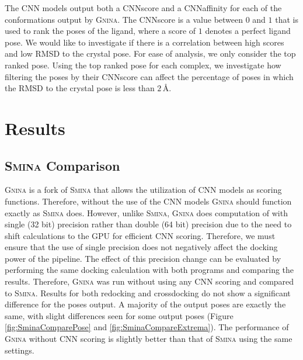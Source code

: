 \documentclass[journal=jcisd8,manuscript=article]{achemso}
\begin{document}
The CNN models output both a CNNscore and a CNNaffinity for each of the conformations output by \textsc{Gnina}. The CNNscore is a value between $0$ and $1$ that is used to rank the poses of the ligand, where a score of $1$ denotes a perfect ligand pose. We would like to investigate if there is a correlation between high scores and low RMSD to the crystal pose. For ease of analysis, we only consider the top ranked pose. Using the top ranked pose for each complex, we investigate how filtering the poses by their CNNscore can affect the percentage of poses in which the RMSD to the crystal pose is less than $2\,$\AA.

\section{Results}
\subsection{\textsc{Smina} Comparison}
\textsc{Gnina} is a fork of \textsc{Smina} that allows the utilization of CNN models as scoring functions. Therefore, without the use of the CNN models \textsc{Gnina} should function exactly as \textsc{Smina} does. However, unlike \textsc{Smina}, \textsc{Gnina} does computation of with single (32 bit) precision rather than double (64 bit) precision due to the need to shift calculations to the GPU for efficient CNN scoring. Therefore, we must ensure that the use of single precision does not negatively affect the docking power of the pipeline. The effect of this precision change can be evaluated by performing the same docking calculation with both programs and comparing the results.
Therefore, \textsc{Gnina} was run without using any CNN scoring and compared to \textsc{Smina}. Results for both redocking and crossdocking do not show a significant difference for the poses output. A majority of the output poses are exactly the same, with slight differences seen for some output poses (Figure \ref{fig:SminaComparePose} and \ref{fig:SminaCompareExtrema}). The performance of \textsc{Gnina} without CNN scoring is slightly better than that of \textsc{Smina} using the same settings.
\end{document}
